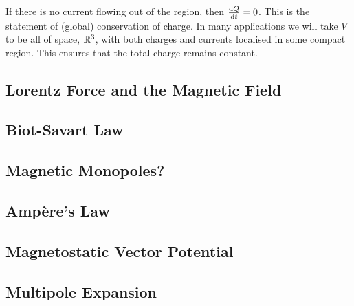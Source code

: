 If there is no current flowing out of the region, then $\dv{Q}{t}=0$. This is the statement of (global) conservation of charge. In many applications we will take $V$ to be all of space, $\mathbb R^3$, with both charges and currents localised in some compact region. This ensures that the total charge remains constant.

\subsection{Lorentz Force and the Magnetic Field}
\subsection{Biot-Savart Law}
\subsection{Magnetic Monopoles?}
\subsection{Amp\`{e}re's Law}
\subsection{Magnetostatic Vector Potential}
\subsection{Multipole Expansion}
